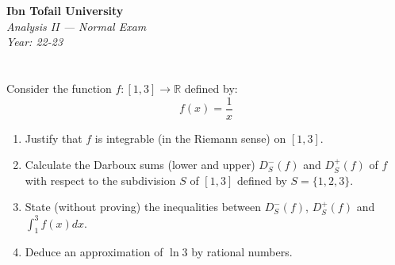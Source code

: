\documentclass[12pt]{article}
\begin{document}
\begin{center}
  \Large\textbf{Ibn Tofail University} \\[1em]
  \large\textit{Analysis II — Normal Exam} \\[0.5em]
  \large\textit{Year: 22-23} \\[2em]
\end{center}

\vspace{0.5cm}

\section{}
Consider the function $f: [1, 3] \to \mathbb{R}$ defined by:
$$f(x) = \frac{1}{x}$$

\begin{enumerate}
    \item Justify that $f$ is integrable (in the Riemann sense) on $[1, 3]$.
    \item Calculate the Darboux sums (lower and upper) $D^-_S(f)$ and $D^+_S(f)$ of $f$ with respect to the subdivision $S$ of $[1, 3]$ defined by $S = \{1, 2, 3\}$.
    \item State (without proving) the inequalities between $D^-_S(f)$, $D^+_S(f)$ and $\int_1^3 f(x) dx$.
    \item Deduce an approximation of $\ln 3$ by rational numbers.
\end{enumerate}

\newpage
\end{document}
